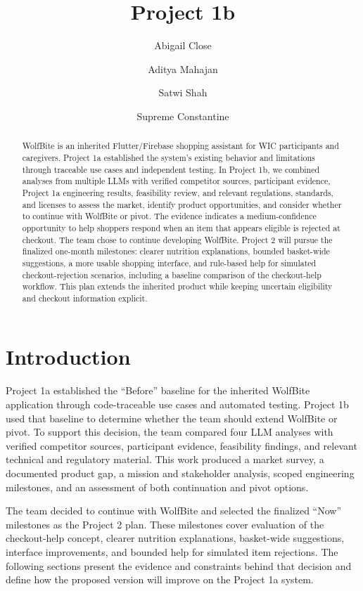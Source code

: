 \documentclass[sigconf]{acmart}
\title{Project 1b}
\author{Abigail Close}
\affiliation{%
  \institution{North Carolina State University}
  \city{Raleigh}
  \state{North Carolina}
  \country{USA}}
\author{Aditya Mahajan}
\affiliation{%
  \institution{North Carolina State University}
  \city{Raleigh}
  \state{North Carolina}
  \country{USA}}
\author{Satwi Shah}
\affiliation{%
  \institution{North Carolina State University}
  \city{Raleigh}
  \state{North Carolina}
  \country{USA}}
\author{Supreme Constantine}
\affiliation{%
  \institution{North Carolina State University}
  \city{Raleigh}
  \state{North Carolina}
  \country{USA}}
\begin{document}
\begin{abstract}
WolfBite is an inherited Flutter/Firebase shopping assistant for WIC
participants and caregivers. Project 1a established the system's existing
behavior and limitations through traceable use cases and independent testing.
In Project 1b, we combined analyses from multiple LLMs with verified competitor
sources, participant evidence, Project 1a engineering results, feasibility
review, and relevant regulations, standards, and licenses to assess the market,
identify product opportunities, and consider whether to continue with WolfBite
or pivot. The evidence indicates a medium-confidence opportunity to help
shoppers respond when an item that appears eligible is rejected at checkout.
The team chose to continue developing WolfBite. Project 2 will pursue the
finalized one-month milestones: clearer nutrition explanations, bounded
basket-wide suggestions, a more usable shopping interface, and rule-based help
for simulated checkout-rejection scenarios, including a baseline comparison of
the checkout-help workflow. This plan extends the inherited product while
keeping uncertain eligibility and checkout information explicit.
\end{abstract}

\maketitle

\section{Introduction}

Project 1a established the ``Before'' baseline for the inherited WolfBite
application through code-traceable use cases and automated testing. Project 1b
used that baseline to determine whether the team should extend WolfBite or
pivot. To support this decision, the team compared four LLM analyses with
verified competitor sources, participant evidence, feasibility findings, and
relevant technical and regulatory material. This work produced a market survey,
a documented product gap, a mission and stakeholder analysis, scoped
engineering milestones, and an assessment of both continuation and pivot
options.

The team decided to continue with WolfBite and selected the finalized ``Now''
milestones as the Project 2 plan. These milestones cover evaluation of the
checkout-help concept, clearer nutrition explanations, basket-wide suggestions,
interface improvements, and bounded help for simulated item rejections. The
following sections present the evidence and constraints behind that decision
and define how the proposed version will improve on the Project 1a system.
\end{document}
